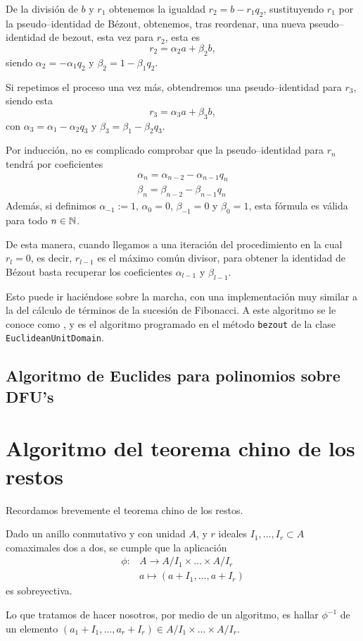 \documentclass[a4paper, 11pt, twoside, notitlepage, openany, onecolumn, final]{report}
\begin{document}
	De la división de  $b$ y $r_1$ obtenemos la igualdad $r_2=b-r_1q_2$, sustituyendo $r_1$ por la pseudo--identidad de Bézout, obtenemos, tras reordenar, una nueva pseudo--identidad de bezout, esta vez para $r_2$, esta es
	\begin{equation*}
		r_2=\alpha_2a+\beta_2b,
	\end{equation*}
	siendo $\alpha_2=-\alpha_1q_2$ y $\beta_2=1-\beta_1q_2$.
	
	Si repetimos el proceso una vez más, obtendremos una pseudo--identidad para $r_3$, siendo esta
	\begin{equation*}
		r_3=\alpha_3a+\beta_3b,
	\end{equation*}
	con $\alpha_3=\alpha_1-\alpha_2q_3$ y $\beta_3=\beta_1-\beta_2q_3$.
	
	Por inducción, no es complicado comprobar que la pseudo--identidad para $r_n$ tendrá por coeficientes
	\begin{equation*}
		\begin{array}{c}
			\alpha_n=\alpha_{n-2}-\alpha_{n-1}q_n\\
			\beta_n=\beta_{n-2}-\beta_{n-1}q_n
		\end{array}
	\end{equation*}
	Además, si definimos $\alpha_{-1}:=1$, $\alpha_{0}=0$, $\beta_{-1}=0$ y $\beta_{0}=1$, esta fórmula es válida para todo $n\in\mathbb{N}$.
	
	De esta manera, cuando llegamos a una iteración del procedimiento en la cual $r_l=0$, es decir, $r_{l-1}$ es el máximo común divisor, para obtener la identidad de Bézout basta recuperar los coeficientes $\alpha_{l-1}$ y $\beta_{l-1}$.
	
	Esto puede ir haciéndose sobre la marcha, con una implementación muy similar a la del cálculo de términos de la sucesión de Fibonacci. A este algoritmo se le conoce como , y es el algoritmo programado en el método \texttt{bezout} de la clase \texttt{EuclideanUnitDomain}.
	\subsection{Algoritmo de Euclides para polinomios sobre DFU's}
	\section{Algoritmo del teorema chino de los restos}
	Recordamos brevemente el teorema chino de los restos.
	\begin{theo}
		Dado un anillo conmutativo y con unidad $A$, y $r$ ideales $I_1,\dots,I_r\subset A$ comaximales dos a dos, se cumple que la aplicación
		\begin{equation*}
			\begin{array}{cc}
			\phi:&A\to A/I_1\times\dots\times A/I_r\\
			& a\mapsto (a+I_1,\dots,a+I_r)
			\end{array}
		\end{equation*}
		es sobreyectiva.
	\end{theo}
	Lo que tratamos de hacer nosotros, por medio de un algoritmo, es hallar $\phi^{-1}$ de un elemento $(a_1+I_1,\dots,a_r+I_r)\in A/I_1\times\dots\times A/I_r$.
\end{document}
